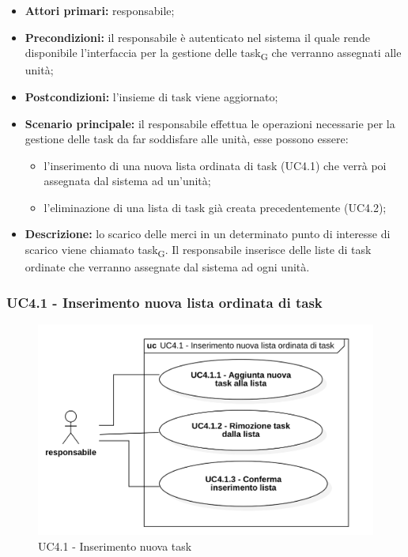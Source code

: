 \begin{itemize}
	\item 	\textbf{Attori primari:} responsabile;
	\item 	\textbf{Precondizioni:} il responsabile è autenticato nel sistema il quale rende disponibile l'interfaccia per la gestione delle task\textsubscript{G} che verranno assegnati alle unità;
	\item 	\textbf{Postcondizioni:} l'insieme di task viene aggiornato;
	\item 	\textbf{Scenario principale:} il responsabile effettua le operazioni necessarie per la gestione delle task da far soddisfare alle unità, esse possono essere:
	\begin{itemize}
		\item l'inserimento di una nuova lista ordinata di task (UC4.1) che verrà poi assegnata dal sistema ad un'unità;
		\item l'eliminazione di una lista di task già creata precedentemente (UC4.2);
	\end{itemize}
	\item 	\textbf{Descrizione:} lo scarico delle merci in un determinato punto di interesse di scarico viene chiamato task\textsubscript{G}. Il responsabile inserisce delle liste di task ordinate che verranno assegnate dal sistema ad ogni unità. 

\end{itemize}

\subsubsection{UC4.1 - Inserimento nuova lista ordinata di task}

\begin{figure}[H]
	\centering
	\includegraphics[scale=0.52]{res/images/uc4-1.png}
	\caption{UC4.1 - Inserimento nuova task}
\end{figure}

